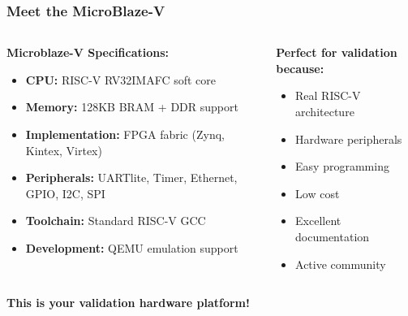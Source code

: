 \documentclass{beamer}
\begin{document}
\begin{frame}
\frametitle{Meet the MicroBlaze-V}
\begin{columns}[T]
\begin{column}{0.6\textwidth}
\textbf{Microblaze-V Specifications:}
\begin{itemize}
    \item \footnotesize \textbf{CPU:} RISC-V RV32IMAFC soft core
    \item \footnotesize \textbf{Memory:} 128KB BRAM + DDR support
    \item \footnotesize \textbf{Implementation:} FPGA fabric (Zynq, Kintex, Virtex)
    \item \footnotesize \textbf{Peripherals:} UARTlite, Timer, Ethernet, GPIO, I2C, SPI
    \item \footnotesize \textbf{Toolchain:} Standard RISC-V GCC
    \item \footnotesize \textbf{Development:} QEMU emulation support
\end{itemize}
\end{column}
\begin{column}{0.4\textwidth}
\textbf{Perfect for validation because:}
\begin{itemize}
    \item \footnotesize Real RISC-V architecture
    \item \footnotesize Hardware peripherals
    \item \footnotesize Easy programming
    \item \footnotesize Low cost
    \item \footnotesize Excellent documentation
    \item \footnotesize Active community
\end{itemize}
\end{column}
\end{columns}

\vspace{0.5cm}
\begin{center}
\textbf{This is your validation hardware platform!}
\end{center}
\end{frame}
\end{document}
